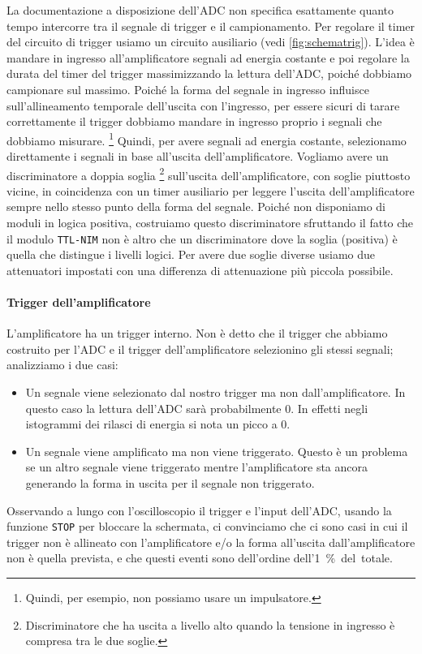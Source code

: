La documentazione a disposizione dell'ADC non specifica esattamente
quanto tempo intercorre tra il segnale di trigger e il campionamento.
Per regolare il timer del circuito di trigger usiamo un circuito ausiliario
(vedi \autoref{fig:schematrig}).
L'idea è mandare in ingresso all'amplificatore segnali ad energia costante
e poi regolare la durata del timer del trigger massimizzando la lettura dell'ADC,
poiché dobbiamo campionare sul massimo.
Poiché la forma del segnale in ingresso influisce sull'allineamento temporale
dell'uscita con l'ingresso,
per essere sicuri di tarare correttamente il trigger
dobbiamo mandare in ingresso proprio i segnali che dobbiamo misurare.%
\footnote{Quindi, per esempio, non possiamo usare un impulsatore.}
Quindi, per avere segnali ad energia costante,
selezionamo direttamente i segnali in base all'uscita dell'amplificatore.
Vogliamo avere un discriminatore a doppia soglia%
\footnote{Discriminatore che ha uscita a livello alto quando la tensione in ingresso è compresa tra le due soglie.}
sull'uscita dell'amplificatore, con soglie piuttosto vicine,
in coincidenza con un timer ausiliario per leggere l'uscita dell'amplificatore
sempre nello stesso punto della forma del segnale.
Poiché non disponiamo di moduli in logica positiva,
costruiamo questo discriminatore sfruttando il fatto che il modulo \texttt{TTL-NIM}
non è altro che un discriminatore dove la soglia (positiva) è quella che distingue i livelli logici.
Per avere due soglie diverse
usiamo due attenuatori impostati con una differenza di attenuazione più piccola possibile.

\paragraph{Trigger dell'amplificatore}

L'amplificatore ha un trigger interno.
Non è detto che il trigger che abbiamo costruito per l'ADC e il trigger dell'amplificatore
selezionino gli stessi segnali; analizziamo i due casi:
\begin{itemize}
	\item Un segnale viene selezionato dal nostro trigger ma non dall'amplificatore.
	In questo caso la lettura dell'ADC sarà probabilmente 0.
	In effetti negli istogrammi dei rilasci di energia si nota un picco a 0.
	\item Un segnale viene amplificato ma non viene triggerato.
	Questo è un problema se un altro segnale viene triggerato
	mentre l'amplificatore sta ancora generando la forma in uscita per il segnale non triggerato.
\end{itemize}
Osservando a lungo con l'oscilloscopio il trigger e l'input dell'ADC,
usando la funzione \texttt{STOP} per bloccare la schermata,
ci convinciamo che ci sono casi in cui il trigger non è allineato con l'amplificatore
e/o la forma all'uscita dall'amplificatore non è quella prevista,
e che questi eventi sono dell'ordine dell'\SI{1}\% del totale.
